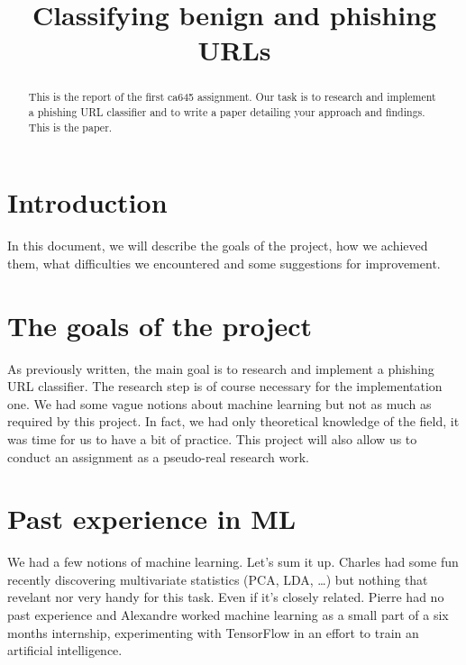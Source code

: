 \documentclass[conference,11pt]{IEEEtran}
\begin{document}
\title{Classifying benign and phishing URLs}

\author{
\and
{}
\and
{}
}

\maketitle

\begin{abstract}
This is the report of the first ca645 assignment. Our task is to research and
implement a phishing URL classifier and to write a paper detailing your approach
and findings. This is the paper.
\end{abstract}

\section{Introduction}
In this document, we will describe the goals of the project, how we achieved
them, what difficulties we encountered and some suggestions for improvement.

\section{The goals of the project}
As previously written, the main goal is to research and implement a phishing URL
classifier. The research step is of course necessary for the implementation one.
We had some vague notions about machine learning but not as much as required by
this project. In fact, we had only theoretical knowledge of the field, it was
time for us to have a bit of practice. This project will also allow us to
conduct an assignment as a pseudo-real research work.

\section{Past experience in ML}
We had a few notions of machine learning. Let's sum it up. Charles had some fun
recently discovering multivariate statistics (PCA, LDA, \ldots) but nothing that
revelant nor very handy for this task. Even if it's closely related. Pierre had
no past experience and Alexandre worked machine learning as a small part of a
six months internship, experimenting with TensorFlow in an effort to train an
artificial intelligence.
\end{document}
